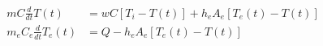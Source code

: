 \begin{equation}
  \begin{aligned}
    m C \frac{d}{dt}T(t) &= w C [T_i - T(t)] + h_e A_e [T_e(t) - T(t)]
    \\
    m_e C_e \frac{d}{dt}T_e(t) &= Q - h_e A_e [T_e(t) - T(t)]
  \end{aligned}
  \label{eq:elec_heat_tank01_1}
\end{equation}